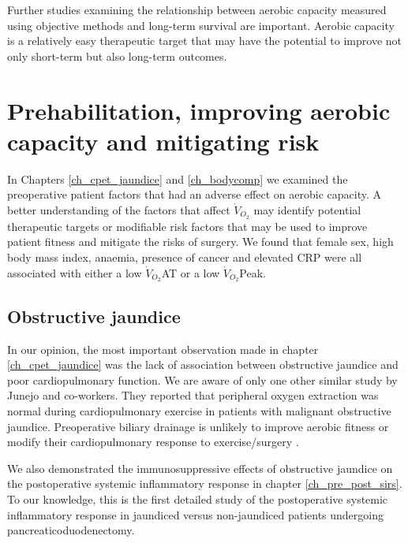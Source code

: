 Further studies examining the relationship between aerobic capacity measured using objective methods and long-term survival are important. 
Aerobic capacity is a relatively easy therapeutic target that may have the potential to improve not only short-term but also long-term outcomes. 


\section{Prehabilitation, improving aerobic capacity and mitigating risk}
\label{disc_prehabilitation}
In Chapters \ref{ch_cpet_jaundice} and \ref{ch_bodycomp} we examined the preoperative patient factors that had an adverse effect on aerobic capacity.
A better understanding of the factors that affect $\dot{V}_{O_2}$ may identify potential therapeutic targets or modifiable risk factors that may be used to improve patient fitness and mitigate the risks of surgery.
We found that female sex, high body mass index, anaemia, presence of cancer and elevated CRP were all associated with either a low $\dot{V}_{O_2}$AT or a low $\dot{V}_{O_2}$Peak.

\subsection{Obstructive jaundice}
In our opinion, the most important observation made in chapter \ref{ch_cpet_jaundice} was the lack of association between obstructive jaundice and poor cardiopulmonary function. 
We are aware of only one other similar study by Junejo and co-workers. They reported that peripheral oxygen extraction was normal during cardiopulmonary exercise in patients with malignant obstructive jaundice.\parencite{junejo_peripheral_2014} 
Preoperative biliary drainage is unlikely to improve aerobic fitness or modify their cardiopulmonary response to exercise/surgery \parencite{parker_serum_2014}.

We also demonstrated the immunosuppressive effects of obstructive jaundice on the postoperative systemic inflammatory response in chapter \ref{ch_pre_post_sirs}. 
To our knowledge, this is the first detailed study of the postoperative systemic inflammatory response in jaundiced versus non-jaundiced patients undergoing pancreaticoduodenectomy.

